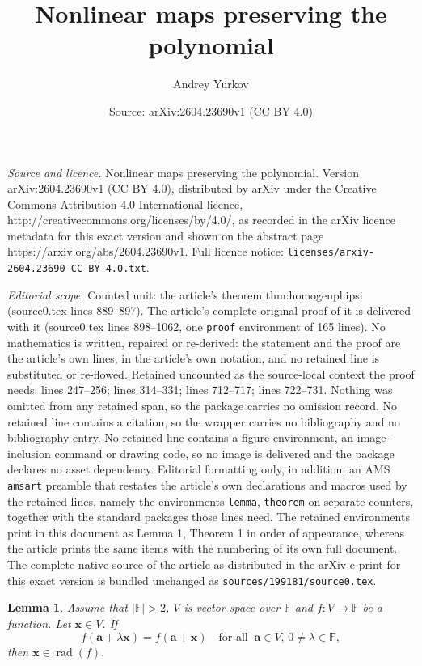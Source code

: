 \documentclass[10pt,a4paper]{amsart}
\title{Nonlinear maps preserving the polynomial}
\author{Andrey Yurkov}
\date{Source: arXiv:2604.23690v1 (CC BY 4.0)}
\newtheorem{lemma}{Lemma}
\def\F{{\mathbb F}}
\DeclareMathOperator{\rad}{rad}
\begin{document}
\maketitle

\noindent\emph{Source and licence.} Nonlinear maps preserving the polynomial. Version arXiv:2604.23690v1 (CC BY 4.0), distributed by arXiv under the Creative Commons Attribution 4.0 International licence, http://creativecommons.org/licenses/by/4.0/, as recorded in the arXiv licence metadata for this exact version and shown on the abstract page https://arxiv.org/abs/2604.23690v1. Full licence notice: \texttt{licenses/arxiv-2604.23690-CC-BY-4.0.txt}.\par\smallskip

\noindent\textit{Editorial scope.} Counted unit: the article's theorem thm:homogenphipsi (source0.tex lines 889--897). The article's complete original proof of it is delivered with it (source0.tex lines 898--1062, one \texttt{proof} environment of 165 lines). No mathematics is written, repaired or re-derived: the statement and the proof are the article's own lines, in the article's own notation, and no retained line is substituted or re-flowed.  Retained uncounted as the source-local context the proof needs: lines 247--256; lines 314--331; lines 712--717; lines 722--731.  Nothing was omitted from any retained span, so the package carries no omission record.  No retained line contains a citation, so the wrapper carries no bibliography and no bibliography entry.  No retained line contains a figure environment, an image-inclusion command or drawing code, so no image is delivered and the package declares no asset dependency.  Editorial formatting only, in addition: an AMS \texttt{amsart} preamble that restates the article's own declarations and macros used by the retained lines, namely the environments \texttt{lemma}, \texttt{theorem} on separate counters, together with the standard packages those lines need.  The retained environments print in this document as Lemma 1, Theorem 1 in order of appearance, whereas the article prints the same items with the numbering of its own full document.  The complete native source of the article as distributed in the arXiv e-print for this exact version is bundled unchanged as \texttt{sources/199181/source0.tex}.
\begin{lemma}\label{lem:StrangeCondImplyRadP}
Assume that $|\F| > 2$, $V$ is vector space over $\F$ and $f\colon V \to \F$ be a function. Let $\mathbf x \in V$. If  
\begin{equation}\label{lem:StrangeCondImplyRadP:eqq1}
f(\mathbf a + \lambda \mathbf x) = f(\mathbf a + \mathbf x)\quad\mbox{for all}\;\;\mathbf a \in V,\, 0 \neq \lambda \in \F, 
\end{equation}
then $\mathbf x \in \rad (f)$.
\end{lemma}
\end{document}
